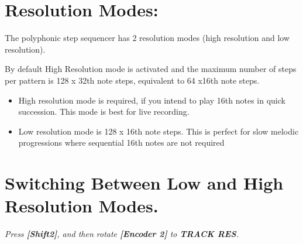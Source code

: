 \vspace{-0.3cm}

\section{Resolution Modes:}
The polyphonic step sequencer has 2 resolution modes (high resolution and low resolution).

By default High Resolution mode is activated and the maximum number of steps per pattern is 128 x 32th note steps, equivalent to 64 x16th note steps.
\begin{itemize}
\item High resolution mode is required, if you intend to play 16th notes in quick succession. This mode is best for live recording.
\item Low resolution mode is 128 x 16th note steps. This is perfect for slow melodic progressions where sequential 16th notes are not required
\end{itemize}

\vspace{-0.3cm}

\section{Switching Between Low and High Resolution Modes.}
\textit{Press \textbf{[Shift2]}, and then rotate \textbf{[Encoder 2]} to \textbf{TRACK RES}.}
